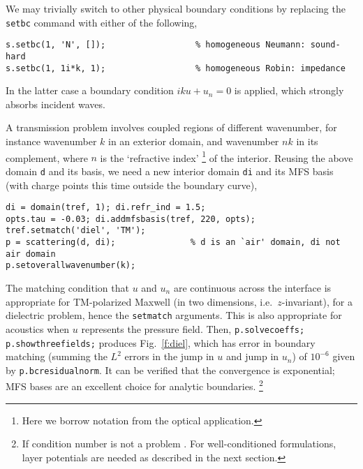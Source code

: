 We may trivially switch to other physical boundary conditions by replacing
the {\tt setbc} command with either of the following,
\begin{verbatim}
s.setbc(1, 'N', []);                  % homogeneous Neumann: sound-hard
s.setbc(1, 1i*k, 1);                  % homogeneous Robin: impedance
\end{verbatim}
In the latter case a boundary condition $iku + u_n=0$ is applied, which
strongly absorbs incident waves.

\bfi %
\efi

A transmission problem involves coupled regions of different wavenumber,
for instance wavenumber $k$ in an exterior domain, and wavenumber $nk$ in
its complement, where $n$ is the `refractive index'%
  \footnote{Here we borrow notation from the optical application.}
of the interior.
Reusing the above domain {\tt d} and its basis, we need a new interior domain
{\tt di}
and its MFS basis (with charge points this time outside the boundary curve),
\begin{verbatim}
di = domain(tref, 1); di.refr_ind = 1.5;
opts.tau = -0.03; di.addmfsbasis(tref, 220, opts);
tref.setmatch('diel', 'TM');
p = scattering(d, di);               % d is an `air' domain, di not air domain
p.setoverallwavenumber(k);
\end{verbatim}
The matching condition that $u$ and $u_n$ are continuous across the interface
is appropriate for TM-polarized Maxwell (in two dimensions, i.e.\
$z$-invariant), for a dielectric problem, hence the {\tt setmatch}
arguments. This is also appropriate for acoustics when $u$ represents
the pressure field.
Then, {\tt p.solvecoeffs; p.showthreefields;} produces
Fig.~\ref{f:diel}, which has error in boundary matching
(summing the $L^2$ errors in the jump in $u$ and jump in $u_n$)
of $10^{-6}$ given by {\tt p.bcresidualnorm}.
It can be verified that the convergence is exponential; MFS bases are an
excellent choice for analytic boundaries.%
  \footnote{If condition number is not a problem \cite{mfs}.
    For well-conditioned
    formulations, layer potentials are needed as described in the next
    section.}

